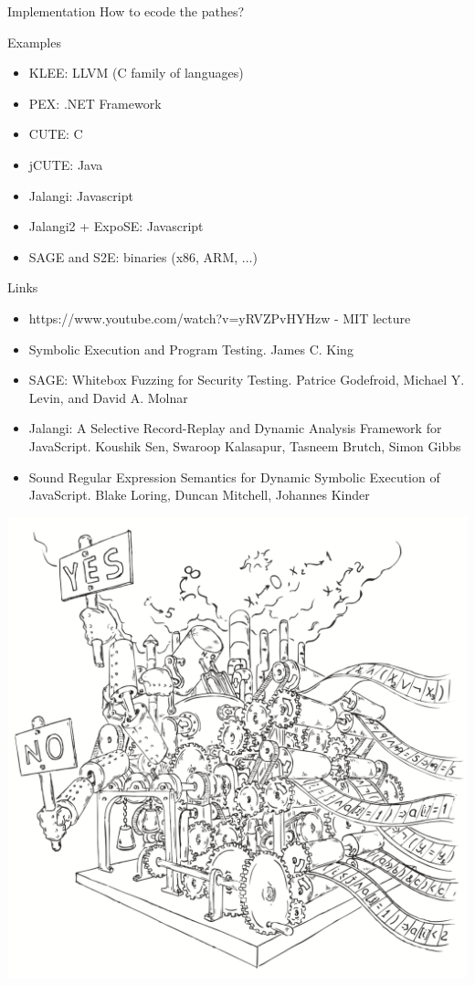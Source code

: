 \documentclass{beamer}
\begin{document}
\begin{frame}[fragile]{Implementation}
How to ecode the pathes?
\end{frame}

\begin{frame}{Examples}
\begin{itemize}
\item KLEE: LLVM (C family of languages)
\item PEX: .NET Framework
\item CUTE: C
\item jCUTE: Java
\item Jalangi: Javascript
\item Jalangi2 + ExpoSE: Javascript
\item SAGE and S2E: binaries (x86, ARM, ...)
\end{itemize}
\end{frame}

\begin{frame}{Links}
\begin{itemize}
\item https://www.youtube.com/watch?v=yRVZPvHYHzw - MIT lecture
\item Symbolic Execution and Program Testing. James C. King
\item SAGE: Whitebox Fuzzing for Security Testing. Patrice Godefroid, Michael Y. Levin, and David A. Molnar
\item Jalangi: A Selective Record-Replay and Dynamic Analysis Framework for JavaScript. Koushik Sen, Swaroop Kalasapur, Tasneem Brutch, Simon Gibbs
\item Sound Regular Expression Semantics for Dynamic Symbolic Execution of JavaScript. Blake Loring, Duncan Mitchell, Johannes Kinder
\end{itemize}
\end{frame}

\begin{frame}
\includegraphics[scale=0.5]{../decision-procedure.png}
\end{frame}
\end{document}

